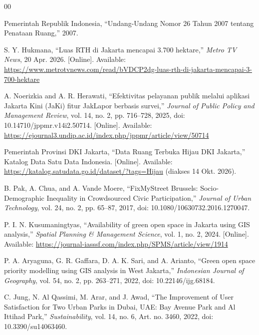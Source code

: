 \documentclass[conference]{IEEEtran}
\begin{document}
\begin{thebibliography}{00}

    Pemerintah Republik Indonesia, ``Undang-Undang Nomor 26 Tahun 2007 tentang Penataan Ruang,'' 2007.

    S. Y. Hukmana, ``Luas RTH di Jakarta mencapai 3.700 hektare,'' \textit{Metro TV News}, 20 Apr. 2026. [Online]. Available: \url{https://www.metrotvnews.com/read/bVDCP2dg-luas-rth-di-jakarta-mencapai-3-700-hektare}

    A. Noerizkia and A. R. Herawati, ``Efektivitas pelayanan publik melalui aplikasi Jakarta Kini (JaKi) fitur JakLapor berbasis survei,'' \textit{Journal of Public Policy and Management Review}, vol. 14, no. 2, pp. 716--728, 2025, doi: 10.14710/jppmr.v14i2.50714. [Online]. Available: \url{https://ejournal3.undip.ac.id/index.php/jppmr/article/view/50714}

    Pemerintah Provinsi DKI Jakarta, ``Data Ruang Terbuka Hijau DKI Jakarta,'' Katalog Data Satu Data Indonesia. [Online]. Available: \url{https://katalog.satudata.go.id/dataset/?tags=Hijau} (diakses 14 Okt. 2026).

    B. Pak, A. Chua, and A. Vande Moere, ``FixMyStreet Brussels: Socio-Demographic Inequality in Crowdsourced Civic Participation,'' \textit{Journal of Urban Technology}, vol. 24, no. 2, pp. 65--87, 2017, doi: 10.1080/10630732.2016.1270047.

    P. I. N. Kusumaningtyas, ``Availability of green open space in Jakarta using GIS analysis,'' \textit{Spatial Planning \& Management Science}, vol. 1, no. 2, 2024. [Online]. Available: \url{https://journal-iasssf.com/index.php/SPMS/article/view/1914}

    P. A. Aryaguna, G. R. Gaffara, D. A. K. Sari, and A. Arianto, ``Green open space priority modelling using GIS analysis in West Jakarta,'' \textit{Indonesian Journal of Geography}, vol. 54, no. 2, pp. 263--271, 2022, doi: 10.22146/ijg.68184.

    C. Jung, N. Al Qassimi, M. Arar, and J. Awad, ``The Improvement of User Satisfaction for Two Urban Parks in Dubai, UAE: Bay Avenue Park and Al Ittihad Park,'' \textit{Sustainability}, vol. 14, no. 6, Art. no. 3460, 2022, doi: 10.3390/su14063460.

\end{thebibliography}
\end{document}
